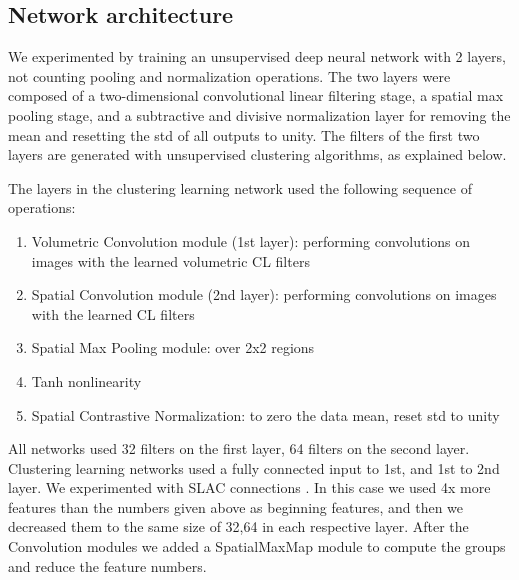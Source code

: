 \documentclass{article} %
\begin{document}
\subsection{Network architecture}
\label{sec-net-arch}

We experimented by training an unsupervised deep neural network with 2 layers, not counting pooling and normalization operations. The two layers were composed of a two-dimensional convolutional linear filtering stage, a spatial max pooling stage, and a subtractive and divisive normalization layer for removing the mean and resetting the std of all outputs to unity. 
The filters of the first two layers are generated with unsupervised clustering algorithms, as explained below. 


The layers in the clustering learning network used the following sequence of operations:
\begin{enumerate}
\item Volumetric Convolution module (1st layer): performing convolutions on images with the learned volumetric CL filters
\item Spatial Convolution module (2nd layer): performing convolutions on images with the learned CL filters
\item Spatial Max Pooling module: over 2x2 regions
\item Tanh nonlinearity
\item Spatial Contrastive Normalization: to zero the data mean, reset std to unity
\end{enumerate}


All networks used 32 filters on the first layer, 64 filters on the second layer. Clustering learning networks used a fully connected input to 1st, and 1st to 2nd layer. We experimented with SLAC connections \cite{}. In this case we used 4x more features than the numbers given above as beginning features, and then we decreased them to the same size of 32,64 in each respective layer. After the Convolution modules we added a SpatialMaxMap module to compute the groups and reduce the feature numbers.
\end{document}
